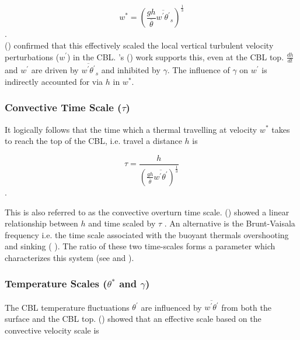 \begin{equation}
w^{*} = \left( \frac{gh}{\overline{\theta}}\overline{w^{'}\theta^{'}}_{s} \right)^{\frac{1}{3}}
\end{equation}.\\

\citeauthor{Deardorff70} (\citeyear{Deardorff70}) confirmed that this effectively scaled the local vertical turbulent velocity
perturbations ($w^{'}$) in the \acs{CBL}.  \citeauthor{Sorbjan}'s (\citeyear{Sorbjan}) work  supports this, even at the 
\acs{CBL} top.  $\frac{dh}{dt}$ and $w^{'}$ are driven by $\overline{w^{'}\theta^{'}}_{s}$ and inhibited by  $\gamma$. 
The influence of $\gamma$ on $w^{'}$ is indirectly accounted for via $h$ in $w^{*}$.\\

\subsubsection{Convective Time Scale ($\tau$)}
\label{subsubsec:}

It logically follows that the time which a thermal travelling at velocity 
$w^{*}$ takes to reach the top of the \acs{CBL}, i.e. travel a distance $h$ is

\begin{equation}
\tau = \frac{h}{\left( \frac{gh}{\overline{\theta}}\overline{w^{'}\theta^{'}} \right)^{\frac{1}{3}}}
\end{equation}.

 This is also referred to as the convective overturn time scale.  \citeauthor{SullMoengStev} (\citeyear{SullMoengStev}) 
showed a linear relationship between $h$ and time scaled by $\tau$ . An alternative is the Brunt-Vaisala frequency i.e. the time scale
 associated with the buoyant thermals overshooting and sinking (\citeauthor{FedConzMir04} \cite{FedConzMir04}).  The ratio of these two time-scales forms a parameter which characterizes this system (see \citeauthor{Sorbjan}\citeyear{Sorbjan} and \citeauthor{Deardorff79} \citeyear{Deardorff79}). 

\subsubsection{Temperature Scales ($\theta^{*}$ and $\gamma$)}
\label{subsubsec:}

The \acs{CBL} temperature fluctuations $\theta^{'}$ are influenced by $\overline{w^{'}\theta^{'}}$ from both the surface and the \acs{CBL} top.
\citeauthor {Deardorff70} (\citeyear{Deardorff70}) showed that an effective scale based on the convective velocity scale is

